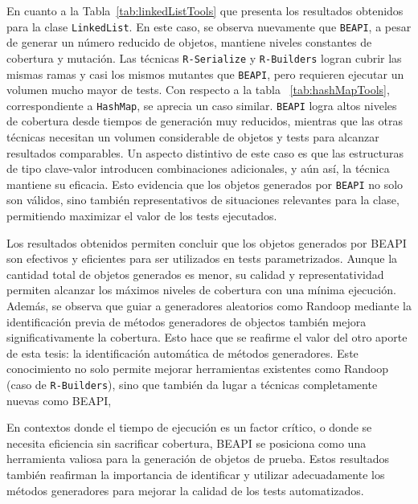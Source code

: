 En cuanto a la Tabla~\ref{tab:linkedListTools} que presenta los resultados obtenidos para la clase 
\texttt{LinkedList}. En este caso, se observa nuevamente que \texttt{BEAPI}, a pesar de 
generar un número reducido de objetos, mantiene niveles constantes de cobertura y mutación. 
Las técnicas \texttt{R-Serialize} y \texttt{R-Builders} logran cubrir las mismas ramas y casi los mismos 
mutantes que \texttt{BEAPI}, pero requieren ejecutar un volumen mucho mayor de tests. Con respecto a la tabla ~\ref{tab:hashMapTools}, 
correspondiente a \texttt{HashMap}, se aprecia un caso 
similar. \texttt{BEAPI} logra altos niveles de cobertura desde tiempos de generación muy 
reducidos, mientras que las otras técnicas necesitan un volumen considerable de objetos y 
tests para alcanzar resultados comparables. Un aspecto distintivo de este caso es que las 
estructuras de tipo clave-valor introducen combinaciones adicionales, y aún así, la técnica 
mantiene su eficacia. Esto evidencia que los objetos generados por \texttt{BEAPI} no solo son 
válidos, sino también representativos de situaciones relevantes para la clase, permitiendo 
maximizar el valor de los tests ejecutados.

Los resultados obtenidos permiten concluir que los objetos generados por \textsf{BEAPI} son 
efectivos y eficientes para ser utilizados en tests parametrizados. Aunque la cantidad total de 
objetos generados es menor, su calidad y representatividad permiten alcanzar los máximos niveles 
de cobertura con una mínima ejecución. Además, se observa que guiar a generadores aleatorios como 
Randoop mediante la identificación previa de métodos generadores de objectos también mejora significativamente 
la cobertura. Esto hace que se reafirme el valor del otro aporte de esta tesis: la identificación automática de métodos generadores.
Este conocimiento no solo permite mejorar herramientas existentes como Randoop (caso de \texttt{R-Builders}), 
sino que también da lugar a técnicas completamente nuevas como \textsf{BEAPI}, 

En contextos donde el tiempo de ejecución es un factor crítico, o donde se necesita eficiencia sin 
sacrificar cobertura, \textsf{BEAPI} se posiciona como una herramienta valiosa para la generación 
de objetos de prueba. Estos resultados también reafirman la importancia de identificar y utilizar 
adecuadamente los métodos generadores para mejorar la calidad de los tests automatizados.












